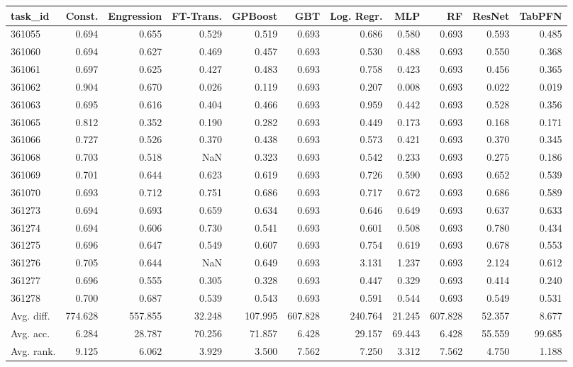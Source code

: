 \begin{tabular}{lrrrrrrrrrr}
\toprule
task\_id & Const. & Engression & FT-Trans. & GPBoost & GBT & Log. Regr. & MLP & RF & ResNet & TabPFN \\
\midrule
361055 & 0.694 & 0.655 & 0.529 & 0.519 & 0.693 & 0.686 & 0.580 & 0.693 & 0.593 & 0.485 \\
361060 & 0.694 & 0.627 & 0.469 & 0.457 & 0.693 & 0.530 & 0.488 & 0.693 & 0.550 & 0.368 \\
361061 & 0.697 & 0.625 & 0.427 & 0.483 & 0.693 & 0.758 & 0.423 & 0.693 & 0.456 & 0.365 \\
361062 & 0.904 & 0.670 & 0.026 & 0.119 & 0.693 & 0.207 & 0.008 & 0.693 & 0.022 & 0.019 \\
361063 & 0.695 & 0.616 & 0.404 & 0.466 & 0.693 & 0.959 & 0.442 & 0.693 & 0.528 & 0.356 \\
361065 & 0.812 & 0.352 & 0.190 & 0.282 & 0.693 & 0.449 & 0.173 & 0.693 & 0.168 & 0.171 \\
361066 & 0.727 & 0.526 & 0.370 & 0.438 & 0.693 & 0.573 & 0.421 & 0.693 & 0.370 & 0.345 \\
361068 & 0.703 & 0.518 & NaN & 0.323 & 0.693 & 0.542 & 0.233 & 0.693 & 0.275 & 0.186 \\
361069 & 0.701 & 0.644 & 0.623 & 0.619 & 0.693 & 0.726 & 0.590 & 0.693 & 0.652 & 0.539 \\
361070 & 0.693 & 0.712 & 0.751 & 0.686 & 0.693 & 0.717 & 0.672 & 0.693 & 0.686 & 0.589 \\
361273 & 0.694 & 0.693 & 0.659 & 0.634 & 0.693 & 0.646 & 0.649 & 0.693 & 0.637 & 0.633 \\
361274 & 0.694 & 0.606 & 0.730 & 0.541 & 0.693 & 0.601 & 0.508 & 0.693 & 0.780 & 0.434 \\
361275 & 0.696 & 0.647 & 0.549 & 0.607 & 0.693 & 0.754 & 0.619 & 0.693 & 0.678 & 0.553 \\
361276 & 0.705 & 0.644 & NaN & 0.649 & 0.693 & 3.131 & 1.237 & 0.693 & 2.124 & 0.612 \\
361277 & 0.696 & 0.555 & 0.305 & 0.328 & 0.693 & 0.447 & 0.329 & 0.693 & 0.414 & 0.240 \\
361278 & 0.700 & 0.687 & 0.539 & 0.543 & 0.693 & 0.591 & 0.544 & 0.693 & 0.549 & 0.531 \\
Avg. diff. & 774.628 & 557.855 & 32.248 & 107.995 & 607.828 & 240.764 & 21.245 & 607.828 & 52.357 & 8.677 \\
Avg. acc. & 6.284 & 28.787 & 70.256 & 71.857 & 6.428 & 29.157 & 69.443 & 6.428 & 55.559 & 99.685 \\
Avg. rank. & 9.125 & 6.062 & 3.929 & 3.500 & 7.562 & 7.250 & 3.312 & 7.562 & 4.750 & 1.188 \\
\bottomrule
\end{tabular}
